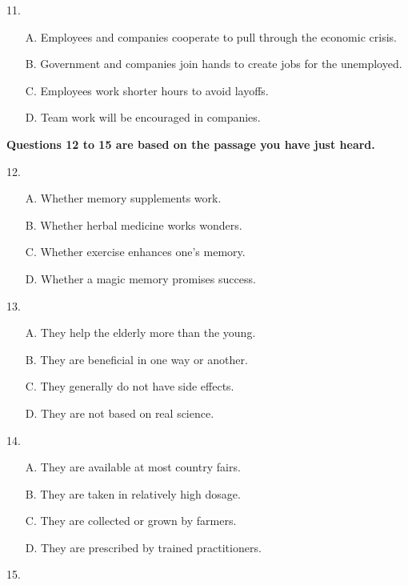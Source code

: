 \documentclass[UTF8,11pt]{ctexart}
\begin{document}
11.


\begin{itemize}[leftmargin=2em,itemsep=.2em,topsep=.4em]\item[A.] Employees and companies cooperate to pull through the economic crisis.
\item[B.] Government and companies join hands to create jobs for the unemployed.
\item[C.] Employees work shorter hours to avoid layoffs.
\item[D.] Team work will be encouraged in companies.
\end{itemize}

\textbf{Questions 12 to 15 are based on the passage you have just heard.}


12.


\begin{itemize}[leftmargin=2em,itemsep=.2em,topsep=.4em]\item[A.] Whether memory supplements work.
\item[B.] Whether herbal medicine works wonders.
\item[C.] Whether exercise enhances one’s memory.
\item[D.] Whether a magic memory promises success.
\end{itemize}

13.


\begin{itemize}[leftmargin=2em,itemsep=.2em,topsep=.4em]\item[A.] They help the elderly more than the young.
\item[B.] They are beneficial in one way or another.
\item[C.] They generally do not have side effects.
\item[D.] They are not based on real science.
\end{itemize}

14.


\begin{itemize}[leftmargin=2em,itemsep=.2em,topsep=.4em]\item[A.] They are available at most country fairs.
\item[B.] They are taken in relatively high dosage.
\item[C.] They are collected or grown by farmers.
\item[D.] They are prescribed by trained practitioners.
\end{itemize}

15.
\end{document}
